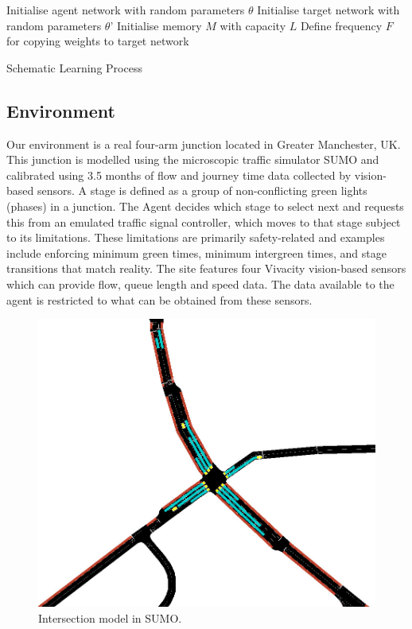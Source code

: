 \documentclass{article}
\begin{document}
\begin{algorithm}
\SetAlgoLined
 Initialise agent network with random parameters $\theta$\;
 Initialise target network with random parameters $\theta$'\;
 Initialise memory $M$ with capacity $L$\;
 Define frequency $F$ for copying weights to target network\;
 \caption{Schematic Learning Process}
\end{algorithm}
\subsection{Environment}

Our environment is a real four-arm junction located in Greater Manchester, UK.
This junction is modelled using the microscopic traffic simulator SUMO \cite{sumo} and calibrated using 3.5 months of flow and journey time data collected by vision-based sensors.
A stage is defined as a group of non-conflicting green lights (phases) in a junction.
The Agent decides which stage to select next and requests this from an emulated traffic signal controller, which moves to that stage subject to its limitations. These limitations are primarily safety-related and examples include enforcing minimum green times, minimum intergreen times, and stage transitions that match reality.
The site features four Vivacity vision-based sensors which can provide flow, queue length and speed data. The data available to the agent is restricted to what can be obtained from these sensors.
\begin{figure}[h]
    \centering
    \includegraphics[width=0.5\linewidth]{figures/intersection.png}
    \caption{Intersection model in SUMO.}
    \label{fig:intersection}
\end{figure}
\end{document}

